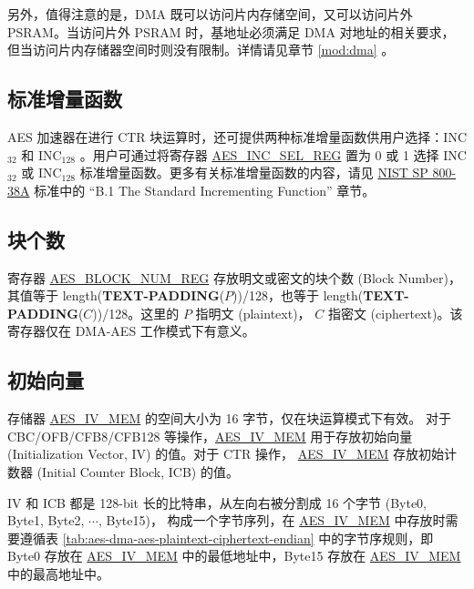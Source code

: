 \documentclass[main\_\_CN.tex]{subfiles}
\begin{document}
另外，值得注意的是，DMA 既可以访问片内存储空间，又可以访问片外 PSRAM。当访问片外 PSRAM 时，基地址必须满足 DMA 对地址的相关要求，但当访问片内存储器空间时则没有限制。详情请见章节 \ref{mod:dma} \textit{}。


\subsection{标准增量函数}\label{sec:aes-Standard-Incrementing-Function}

AES 加速器在进行 CTR 块运算时，还可提供两种标准增量函数供用户选择：INC$_{32}$ 和 INC$_{128}$ 。用户可通过将寄存器 \hyperref[regdesc:AESINCSELREG]{AES\_INC\_SEL\_REG} 置为 0 或 1 选择 INC$_{32}$ 或 INC$_{128}$ 标准增量函数。更多有关标准增量函数的内容，请见 \href{https://nvlpubs.nist.gov/nistpubs/Legacy/SP/nistspecialpublication800-38a.pdf}{NIST SP 800-38A} 标准中的 “B.1 The Standard Incrementing Function” 章节。


\subsection{块个数}\label{sec:aes-block-number}

寄存器 \hyperref[regdesc:AESBLOCKNUMREG]{AES\_BLOCK\_NUM\_REG} 存放明文或密文的块个数 (Block Number)，其值等于 length({\bfseries TEXT-PADDING}($P$))/128，也等于 length({\bfseries TEXT-PADDING}($C$))/128。这里的 $P$ 指明文 (plaintext)， $C$ 指密文 (ciphertext)。该寄存器仅在 DMA-AES 工作模式下有意义。

\subsection{初始向量}\label{sec:aes-init-vector}

\label{memdesc:AESIVMEM} 存储器 \hyperref[memdesc:AESIVMEM]{AES\_IV\_MEM} 的空间大小为 16 字节，仅在块运算模式下有效。
对于 CBC/OFB/CFB8/CFB128 等操作，\hyperref[memdesc:AESIVMEM]{AES\_IV\_MEM} 用于存放初始向量 (Initialization Vector, IV) 的值。对于 CTR 操作， \hyperref[memdesc:AESIVMEM]{AES\_IV\_MEM}  存放初始计数器 (Initial Counter Block, ICB) 的值。

IV 和 ICB 都是 128-bit 长的比特串，从左向右被分割成 16 个字节 (Byte0, Byte1, Byte2, \begin{math}\cdots\end{math}, Byte15)， 构成一个字节序列，在 \hyperref[memdesc:AESIVMEM]{AES\_IV\_MEM} 中存放时需要遵循表 \ref{tab:aes-dma-aes-plaintext-ciphertext-endian} 中的字节序规则，即 Byte0 存放在 \hyperref[memdesc:AESIVMEM]{AES\_IV\_MEM} 中的最低地址中，Byte15 存放在 \hyperref[memdesc:AESIVMEM]{AES\_IV\_MEM} 中的最高地址中。
\end{document}
